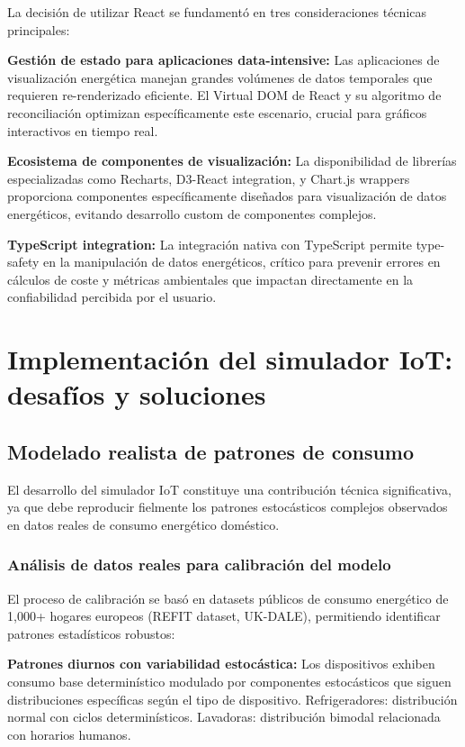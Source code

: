 La decisión de utilizar React se fundamentó en tres consideraciones técnicas principales:

\textbf{Gestión de estado para aplicaciones data-intensive:}
Las aplicaciones de visualización energética manejan grandes volúmenes de datos temporales que requieren re-renderizado eficiente. El Virtual DOM de React y su algoritmo de reconciliación optimizan específicamente este escenario, crucial para gráficos interactivos en tiempo real.

\textbf{Ecosistema de componentes de visualización:}
La disponibilidad de librerías especializadas como Recharts, D3-React integration, y Chart.js wrappers proporciona componentes específicamente diseñados para visualización de datos energéticos, evitando desarrollo custom de componentes complejos.

\textbf{TypeScript integration:}
La integración nativa con TypeScript permite type-safety en la manipulación de datos energéticos, crítico para prevenir errores en cálculos de coste y métricas ambientales que impactan directamente en la confiabilidad percibida por el usuario.

\section{Implementación del simulador IoT: desafíos y soluciones}

\subsection{Modelado realista de patrones de consumo}

El desarrollo del simulador IoT constituye una contribución técnica significativa, ya que debe reproducir fielmente los patrones estocásticos complejos observados en datos reales de consumo energético doméstico.

\subsubsection{Análisis de datos reales para calibración del modelo}

El proceso de calibración se basó en datasets públicos de consumo energético de 1,000+ hogares europeos (REFIT dataset, UK-DALE), permitiendo identificar patrones estadísticos robustos:

\textbf{Patrones diurnos con variabilidad estocástica:}
Los dispositivos exhiben consumo base determinístico modulado por componentes estocásticos que siguen distribuciones específicas según el tipo de dispositivo. Refrigeradores: distribución normal con ciclos determinísticos. Lavadoras: distribución bimodal relacionada con horarios humanos.

